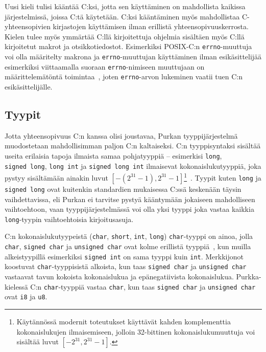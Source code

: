 Uusi kieli tulisi kääntää C:ksi, jotta sen käyttäminen on mahdollista kaikissa
järjestelmissä, joissa C:tä käytetään. C:ksi kääntäminen myös mahdollistaa
C-yhteensopivien kirjastojen käyttämisen ilman erillistä
yhteensopivuuskerrosta. Kielen tulee myös ymmärtää C:llä kirjoitettuja ohjelmia
sisältäen myös C:llä kirjoitetut makrot ja otsikkotiedostot. Esimerkiksi
POSIX-C:n \texttt{errno}-muuttuja voi olla määritelty makrona ja
\texttt{errno}-muuttujan käyttäminen ilman esikäsittelijää esimerkiksi
viittaamalla suoraan \texttt{errno}-nimiseen muuttujaan on määrittelemätöntä
toimintaa~\citep[s. 234]{POSIX}, joten \texttt{errno}-arvon lukeminen vaatii
tuen C:n esikäsittelijälle.

\subsection{Tyypit}

Jotta yhteensopivuus C:n kanssa olisi joustavaa, Purkan tyyppijärjestelmä
muodostetaan mahdollisimman paljon C:n kaltaiseksi. C:n tyyppisyntaksi sisältää
useita erilaisia tapoja ilmaista samaa pohjatyyppiä -- esimerkisi
\texttt{long}, \texttt{signed~long}, \texttt{long~int} ja
\texttt{signed~long~int} ilmaisevat kokonaislukutyyppiä, joka pystyy
sisältämään ainakin luvut $[-(2^{31} - 1), 2^{31}-1]$\footnote{Käytännössä
modernit toteutukset käyttävät kahden komplementtia kokonaislukujen
ilmaisemiseen, jolloin 32-bittinen kokonaislukumuuttuja voi sisältää luvut
$[-2^{31}, 2^{31} - 1]$.}~\citep{C18}. Tyypit kuten \texttt{long} ja
\texttt{signed long} ovat kuitenkin standardien mukaisessa C:ssä keskenään
täysin vaihdettavissa, eli Purkan ei tarvitse pystyä kääntymään jokaiseen
mahdolliseen vaihtoehtoon, vaan tyyppijärjestelmässä voi olla yksi tyyppi joka
vastaa kaikkia \texttt{long}-tyypin vaihtoehtoisia kirjoitusasuja.

C:n kokonaislukutyypeistä (\texttt{char}, \texttt{short}, \texttt{int},
\texttt{long}) \texttt{char}-tyyppi on ainoa, jolla \texttt{char},
\texttt{signed char} ja \texttt{unsigned char} ovat kolme erillistä
tyyppiä~\citep{C18}, kun muilla alkeistyypillä esimerkiksi \texttt{signed int}
on sama tyyppi kuin \texttt{int}. Merkkijonot koostuvat
\texttt{char}-tyyppisistä alkoista, kun taas \texttt{signed char} ja
\texttt{unsigned char} vastaavat tavun kokoista kokonaislukua ja
epänegatiivista kokonaislukua. Purkka-kielessä C:n \texttt{char}-tyyppiä
vastaa \texttt{char}, kun taas \texttt{signed char} ja \texttt{unsigned char}
ovat \texttt{i8} ja \texttt{u8}.

